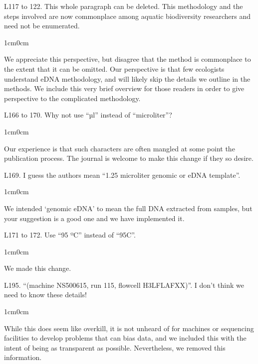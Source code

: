 \documentclass{article}
\newenvironment{response}
	{
	\begin{adjustwidth}{1cm}{0cm}
	\color{peerjBlue}
	}
	{
	\end{adjustwidth}
	}
\begin{document}
L117 to 122. This whole paragraph can be deleted. This methodology and the steps involved are now commonplace among aquatic biodiversity researchers and need not be enumerated.
\begin{response}
  We appreciate this perspective, but disagree that the method is commonplace to the extent that it can be omitted. Our perspective is that few ecologists understand eDNA methodology, and will likely skip the details we outline in the methods.
	We include this very brief overview for those readers in order to give perspective to the complicated methodology.\\
\end{response}

L166 to 170. Why not use ``µl'' instead of ``microliter''?
\begin{response}
  Our experience is that such characters are often mangled at some point the publication process. The journal is welcome to make this change if they so desire.\\
\end{response}

L169. I guess the authors mean ``1.25 microliter genomic or eDNA template''.
\begin{response}
  We intended `genomic eDNA' to mean the full DNA extracted from samples, but your suggestion is a good one and we have implemented it.\\
\end{response}

L171 to 172. Use ``95 ºC'' instead of ``95C''.
\begin{response}
  We made this change.\\
\end{response}

L195. ``(machine NS500615, run 115, flowcell H3LFLAFXX)''. I don't think we need to know these details!
\begin{response}
  While this does seem like overkill, it is not unheard of for machines or sequencing facilities to develop problems that can bias data, and we included this with the intent of being as transparent as possible. Nevertheless, we removed this information.\\
\end{response}
\end{document}
